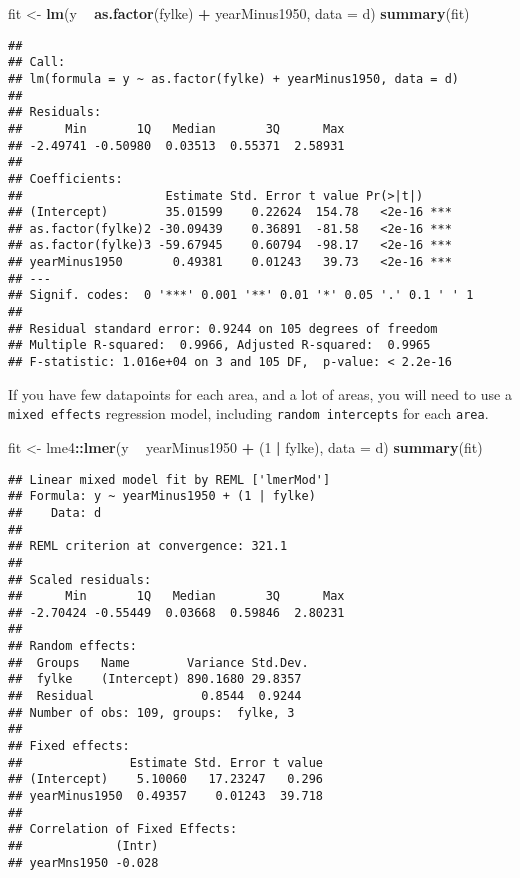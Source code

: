 \documentclass[]{book}
\newenvironment{Shaded}{\begin{snugshade}}{\end{snugshade}}
\newcommand{\KeywordTok}[1]{\textcolor[rgb]{0.13,0.29,0.53}{\textbf{#1}}}
\newcommand{\DataTypeTok}[1]{\textcolor[rgb]{0.13,0.29,0.53}{#1}}
\newcommand{\DecValTok}[1]{\textcolor[rgb]{0.00,0.00,0.81}{#1}}
\newcommand{\StringTok}[1]{\textcolor[rgb]{0.31,0.60,0.02}{#1}}
\newcommand{\OperatorTok}[1]{\textcolor[rgb]{0.81,0.36,0.00}{\textbf{#1}}}
\newcommand{\NormalTok}[1]{#1}
\begin{document}
\begin{Shaded}
\begin{Highlighting}[]
\NormalTok{fit <-}\StringTok{ }\KeywordTok{lm}\NormalTok{(y }\OperatorTok{~}\StringTok{ }\KeywordTok{as.factor}\NormalTok{(fylke) }\OperatorTok{+}\StringTok{ }\NormalTok{yearMinus1950, }\DataTypeTok{data =}\NormalTok{ d)}
\KeywordTok{summary}\NormalTok{(fit)}
\end{Highlighting}
\end{Shaded}

\begin{verbatim}
## 
## Call:
## lm(formula = y ~ as.factor(fylke) + yearMinus1950, data = d)
## 
## Residuals:
##      Min       1Q   Median       3Q      Max 
## -2.49741 -0.50980  0.03513  0.55371  2.58931 
## 
## Coefficients:
##                    Estimate Std. Error t value Pr(>|t|)    
## (Intercept)        35.01599    0.22624  154.78   <2e-16 ***
## as.factor(fylke)2 -30.09439    0.36891  -81.58   <2e-16 ***
## as.factor(fylke)3 -59.67945    0.60794  -98.17   <2e-16 ***
## yearMinus1950       0.49381    0.01243   39.73   <2e-16 ***
## ---
## Signif. codes:  0 '***' 0.001 '**' 0.01 '*' 0.05 '.' 0.1 ' ' 1
## 
## Residual standard error: 0.9244 on 105 degrees of freedom
## Multiple R-squared:  0.9966, Adjusted R-squared:  0.9965 
## F-statistic: 1.016e+04 on 3 and 105 DF,  p-value: < 2.2e-16
\end{verbatim}

If you have few datapoints for each area, and a lot of areas, you will
need to use a \texttt{mixed\ effects} regression model, including
\texttt{random\ intercepts} for each \texttt{area}.

\begin{Shaded}
\begin{Highlighting}[]
\NormalTok{fit <-}\StringTok{ }\NormalTok{lme4}\OperatorTok{::}\KeywordTok{lmer}\NormalTok{(y }\OperatorTok{~}\StringTok{ }\NormalTok{yearMinus1950 }\OperatorTok{+}\StringTok{ }\NormalTok{(}\DecValTok{1} \OperatorTok{|}\StringTok{ }\NormalTok{fylke), }\DataTypeTok{data =}\NormalTok{ d)}
\KeywordTok{summary}\NormalTok{(fit)}
\end{Highlighting}
\end{Shaded}

\begin{verbatim}
## Linear mixed model fit by REML ['lmerMod']
## Formula: y ~ yearMinus1950 + (1 | fylke)
##    Data: d
## 
## REML criterion at convergence: 321.1
## 
## Scaled residuals: 
##      Min       1Q   Median       3Q      Max 
## -2.70424 -0.55449  0.03668  0.59846  2.80231 
## 
## Random effects:
##  Groups   Name        Variance Std.Dev.
##  fylke    (Intercept) 890.1680 29.8357 
##  Residual               0.8544  0.9244 
## Number of obs: 109, groups:  fylke, 3
## 
## Fixed effects:
##               Estimate Std. Error t value
## (Intercept)    5.10060   17.23247   0.296
## yearMinus1950  0.49357    0.01243  39.718
## 
## Correlation of Fixed Effects:
##             (Intr)
## yearMns1950 -0.028
\end{verbatim}
\end{document}
